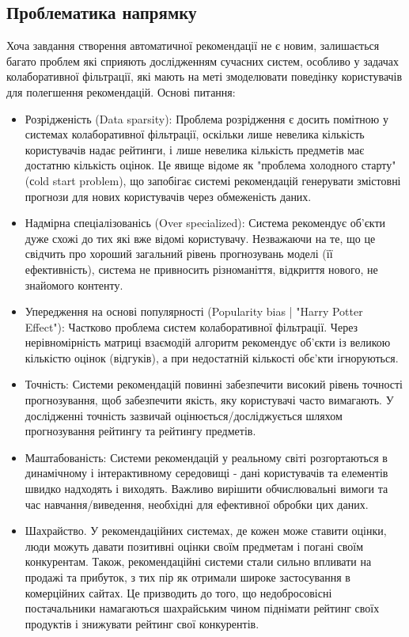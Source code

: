 \subsection{Проблематика напрямку}
Хоча завдання створення автоматичної рекомендації не є новим, залишається багато проблем які сприяють дослідженням сучасних систем, особливо у задачах колаборативної фільтрації, які мають на меті змоделювати поведінку користувачів для полегшення рекомендацій. Основі питання:
\begin{itemize}
    \item Розрідженість (Data sparsity): Проблема розрідження є досить помітною у системах колаборативної фільтрації, оскільки лише невелика кількість користувачів надає рейтинги, і лише невелика кількість предметів має достатню кількість оцінок. Це явище відоме як "проблема холодного старту" (сold start problem), що запобігає системі рекомендацій генерувати змістовні прогнози для нових користувачів через обмеженість даних.
    \item Надмірна спеціалізованісь (Over specialized): Система рекомендує об’єкти дуже схожі до тих які вже відомі користувачу. Незважаючи на те, що це свідчить про хороший загальний рівень прогнозувань моделі (її ефективність), система не привносить різноманіття, відкриття нового, не знайомого контенту.
    \item Упередження на основі популярності (Popularity bias | "Harry Potter Effect"): Частково проблема систем колаборативної фільтрації. Через нерівномірність матриці взаємодій алгоритм рекомендує об’єкти із великою кількістю оцінок (відгуків), а при  недостатній кількості обє’кти ігноруються.
    \item Точність: Системи рекомендацій повинні забезпечити високий рівень точності прогнозування, щоб забезпечити якість, яку користувачі часто вимагають. У дослідженні точність зазвичай оцінюється/досліджується шляхом прогнозування рейтингу та рейтингу предметів.
    \item Маштабованість: Системи рекомендацій у реальному світі розгортаються в динамічному і інтерактивному середовищі - дані користувачів та елементів швидко надходять і виходять. Важливо вирішити обчислювальні вимоги та час навчання/виведення, необхідні для ефективної обробки цих даних.
    \item Шахрайство.
          У рекомендаційних системах, де кожен може ставити оцінки, люди можуть давати позитивні оцінки своїм предметам і погані своїм конкурентам. Також, рекомендаційні системи стали сильно впливати на продажі та прибуток, з тих пір як отримали широке застосування в комерційних сайтах. Це призводить до того, що недобросовісні постачальники намагаються шахрайським чином піднімати рейтинг своїх продуктів і знижувати рейтинг свої конкурентів.


\end{itemize}
